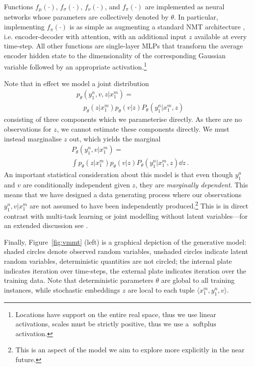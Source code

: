 \documentclass[11pt,a4paper]{article}
\DeclareMathOperator{\softplus}{softplus}
\begin{document}
Functions $f_\mu(\cdot)$, $f_\sigma(\cdot)$, $f_\nu(\cdot)$, and $f_\pi(\cdot)$ are implemented as neural networks whose parameters are collectively denoted by $\theta$. In particular, implementing $f_\pi(\cdot)$ is as simple as augmenting a standard NMT architecture \citep{BahdanauChoBengio2015,Luongetal2015}, i.e. encoder-decoder with attention, with an additional input $z$ available at every time-step. All other functions are single-layer MLPs that transform the average encoder hidden state to the dimensionality of the corresponding Gaussian variable followed by an appropriate activation.\footnote{Locations have support on the entire real space, thus we use linear activations, scales must be strictly positive, thus we use a $\softplus$ activation.} 

Note that in effect we model a joint distribution 
\begin{equation}
\begin{aligned}
& p_\theta(y_1^n, v, z|x_1^m) =\\
&\quad p_\theta(z|x_1^m) p_\theta(v|z) P_\theta(y_1^n|x_1^m, z)
\end{aligned}
\end{equation}
consisting of three components which we parameterise directly.
As there are no observations for $z$, we cannot estimate these components directly.
We must instead marginalise $z$ out, which yields the marginal
\begin{equation}\label{eq:marginal}
\begin{aligned}
& P_\theta(y_1^n, v|x_1^m) = \\
&\int p_\theta(z|x_1^m) p_\theta(v|z) P_\theta(y_1^n|x_1^m, z) \dd z ~.
\end{aligned}
\end{equation}
An important statistical consideration about this model is that even though $y_1^n$ and $v$ are conditionally independent given $z$, they are \emph{marginally dependent}. 
This means that we have designed a data generating process where our observations $y_1^n, v|x_1^m$ are not assumed to have been independently produced.\footnote{This is an aspect of the model we aim to explore more explicitly in the near future.}
This is in direct contrast with multi-task learning or joint modelling without latent variables---for an extended discussion see \citep[\S~3]{eikema2018auto}.

Finally, Figure~\ref{fig:vmmt} (left) is a graphical depiction of the generative model: shaded circles denote observed random variables, unshaded circles indicate latent random variables, deterministic quantities are not circled; the internal plate indicates iteration over time-steps, the external plate indicates iteration over the training data. Note that deterministic parameters $\theta$ are global to all training instances, while stochastic embeddings $z$ are local to each tuple $\langle x_1^m, y_1^n, v \rangle$.
\end{document}
